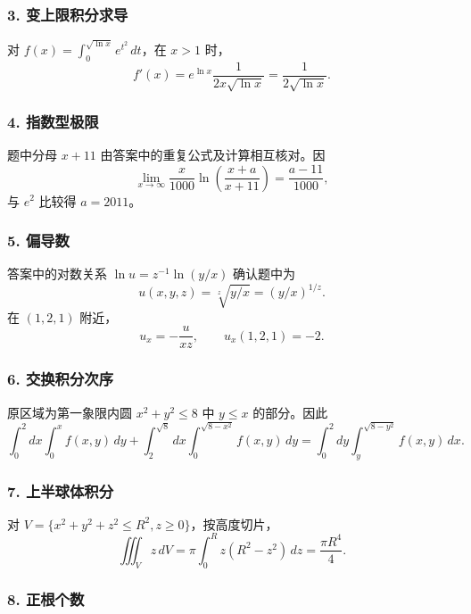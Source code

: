 \documentclass[11pt,fontset=fandol]{ctexart}
\begin{document}
\subsubsection{3.
变上限积分求导}\label{ux53d8ux4e0aux9650ux79efux5206ux6c42ux5bfc}

对 \(f(x)=\int_0^{\sqrt{\ln x}}e^{t^2}\,dt\)，在 \(x>1\) 时， \[
\boxed{f'(x)=e^{\ln x}\frac1{2x\sqrt{\ln x}}=\frac1{2\sqrt{\ln x}}.}
\]

\subsubsection{4. 指数型极限}\label{ux6307ux6570ux578bux6781ux9650}

题中分母 \(x+11\) 由答案中的重复公式及计算相互核对。因 \[
\lim_{x\to\infty}\frac{x}{1000}\ln\left(\frac{x+a}{x+11}\right)=\frac{a-11}{1000},
\] 与 \(e^2\) 比较得 \(\boxed{a=2011}\)。

\subsubsection{5. 偏导数}\label{ux504fux5bfcux6570}

答案中的对数关系 \(\ln u=z^{-1}\ln(y/x)\) 确认题中为 \[
u(x,y,z)=\sqrt[z]{y/x}=(y/x)^{1/z}.
\] 在 \((1,2,1)\) 附近， \[
u_x=-\frac{u}{xz},\qquad \boxed{u_x(1,2,1)=-2.}
\]

\subsubsection{6.
交换积分次序}\label{ux4ea4ux6362ux79efux5206ux6b21ux5e8f}

原区域为第一象限内圆 \(x^2+y^2\leq8\) 中 \(y\leq x\) 的部分。因此 \[
\boxed{\int_0^2dx\int_0^xf(x,y)\,dy
+\int_2^{\sqrt8}dx\int_0^{\sqrt{8-x^2}}f(x,y)\,dy
=\int_0^2dy\int_y^{\sqrt{8-y^2}}f(x,y)\,dx.}
\]

\subsubsection{7.
上半球体积分}\label{ux4e0aux534aux7403ux4f53ux79efux5206}

对 \(V=\{x^2+y^2+z^2\leq R^2,z\geq0\}\)，按高度切片， \[
\boxed{\iiint_Vz\,dV=\pi\int_0^Rz(R^2-z^2)\,dz=\frac{\pi R^4}{4}.}
\]

\subsubsection{8. 正根个数}\label{ux6b63ux6839ux4e2aux6570}
\end{document}
